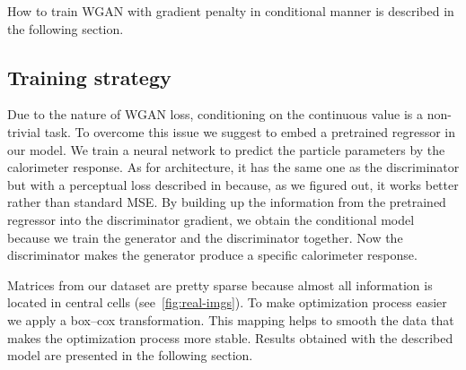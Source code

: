 How to train WGAN with gradient penalty in conditional manner is described in the following section.

\subsection{Training strategy} \label{sec:training_strategy}
Due to the nature of WGAN loss, conditioning on the continuous value is a non-trivial task. To overcome this issue we suggest to embed a pretrained regressor in our model. We train a neural network to predict the particle parameters by the calorimeter response. As for architecture, it has the same one as the discriminator but with a perceptual loss described in \cite{johnson2016perceptual} because, as we figured out, it works better rather than standard MSE. By building up the information from the pretrained regressor into the discriminator gradient, we obtain the conditional model because we train the generator and the discriminator together. Now the discriminator makes the generator produce a specific calorimeter response.

Matrices from our dataset are pretty sparse because almost all information is located in central cells (see~\cref{fig:real-imgs}). To make optimization process easier we apply a box--cox transformation. This mapping helps to smooth the data that makes the optimization process more stable.
Results obtained with the described model are presented in the following section.
